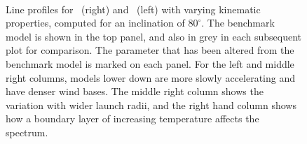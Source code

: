 \documentclass[preprint, a4paper, 11pt]{aastex}
\begin{document}
\begin{figure} %
\mbox{
\quad
{}   
}
\caption{
Line profiles for \ha\ (right) and \hb\ (left) with varying kinematic 
properties, computed for an inclination of $80^\circ$.
The benchmark model is shown in the top panel, and also in grey in each 
subsequent plot for comparison. The parameter that has been altered from the benchmark model 
is marked on each panel. For the left and middle right columns, models lower down
are more slowly accelerating and have denser wind bases. The middle right column
shows the variation with wider launch radii, and the right hand column shows 
how a boundary layer of increasing temperature affects the spectrum.
}
\label{halpha}
\end{figure} %
\end{document}
